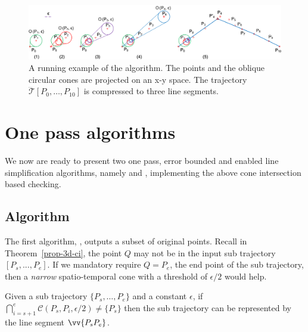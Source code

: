 
\begin{figure}[tb!]
\centering
\includegraphics[scale=0.8]{figures/Fig-conesta.png}
\vspace{-1ex}
\caption{\small A running example of the \cista algorithm. The points and the oblique circular cones are projected on an x-y space. The trajectory $\dddot{\mathcal{T}}[P_0, \ldots, P_{10}]$ is compressed to three line segments.}
\vspace{-2ex}
\label{fig:exm-consta}
\end{figure}


\section{One pass algorithms}
We now are ready to present two one pass, error bounded and \sed enabled line simplification algorithms, namely \cist and \cista, implementing the above cone intersection based \sed checking.






\subsection{{Algorithm \cist}}
The first algorithm, \cist, outputs a subset of original points.
Recall in Theorem~\ref{prop-3d-ci}, the point $Q$ may not be in the input sub trajectory $[P_s,...,P_e]$.
If we mandatory require $Q=P_e$, the end point of the sub trajectory, then a \emph{narrow} spatio-temporal cone with a threshold of $\epsilon/2$ would help.

\begin{theorem}
\label{prop-3d-ci-half}
Given a sub trajectory $\{P_s, \ldots, P_e\}$ and a constant $\epsilon$, if $\bigcap_{i=s+1}^{e}{\mathcal{C}(P_s, P_i, \epsilon/2)} \ne \{P_s\}$ then the sub trajectory can be represented by the line segment $\vv{P_sP_e}$.
\end{theorem}

